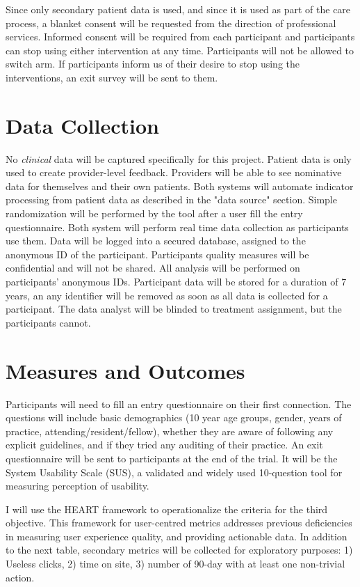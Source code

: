 Since only secondary patient data is used, and since it is used as part of the care process, a blanket consent will be requested from the direction of professional services. Informed consent will be required from each participant and participants can stop using either intervention at any time. Participants will not be allowed to switch arm. If participants inform us of their desire to stop using the interventions, an exit survey will be sent to them.

\section{Data Collection}
No \textit{clinical} data will be captured specifically for this project. Patient data is only used to create provider-level feedback. Providers will be able to see nominative data for themselves and their own patients. Both systems will automate indicator processing from patient data as described in the "data source" section. Simple randomization will be performed by the tool after a user fill the entry questionnaire. Both system will perform real time data collection as participants use them. Data will be logged into a secured database, assigned to the anonymous ID of the participant. Participants quality measures will be confidential and will not be shared. All analysis will be performed on participants' anonymous IDs. Participant data will be stored for a duration of 7 years, an any identifier will be removed as soon as all data is collected for a participant. The data analyst will be blinded to treatment assignment, but the participants cannot.

\section{Measures and Outcomes}

Participants will need to fill an entry questionnaire on their first connection. The questions will include basic demographics (10 year age groups, gender, years of practice, attending/resident/fellow), whether they are aware of following any explicit guidelines, and if they tried any auditing of their practice. An exit questionnaire will be sent to participants at the end of the trial. It will be the System Usability Scale (SUS), a validated and widely used 10-question tool for measuring perception of usability.\cite{united2006research}

I will use the HEART framework to operationalize the criteria for the third objective. This framework for user-centred metrics addresses previous deficiencies in measuring user experience quality, and providing actionable data. In addition to the next table, secondary metrics will be collected for exploratory purposes: 1) Useless clicks, 2) time on site, 3) number of 90-day with at least one non-trivial action.\cite{rodden2010measuring}

